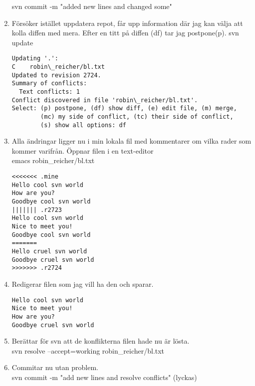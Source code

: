 \documentclass[11pt]{article}
\begin{document}
\begin{enumerate}
svn commit -m "added new lines and changed some" \\
\item Försöker istället uppdatera repot, får upp information där jag kan välja att kolla diffen med mera. Efter en titt på diffen (df) tar jag postpone(p). 
svn update
\begin{verbatim}
Updating '.':
C    robin\_reicher/bl.txt
Updated to revision 2724.
Summary of conflicts:
  Text conflicts: 1
Conflict discovered in file 'robin\_reicher/bl.txt'.
Select: (p) postpone, (df) show diff, (e) edit file, (m) merge,
        (mc) my side of conflict, (tc) their side of conflict,
        (s) show all options: df
\end{verbatim}
\item Alla ändringar ligger nu i min lokala fil med kommentarer om vilka rader som kommer varifrån. Öppnar filen i en text-editor\\
emacs robin\_reicher/bl.txt  \\
\begin{verbatim}
<<<<<<< .mine
Hello cool svn world
How are you?
Goodbye cool svn world
||||||| .r2723
Hello cool svn world
Nice to meet you!
Goodbye cool svn world
=======
Hello cruel svn world
Goodbye cruel svn world
>>>>>>> .r2724
\end{verbatim}
\item Redigerar filen som jag vill ha den och sparar.
\begin{verbatim}
Hello cool svn world
Nice to meet you!
How are you?
Goodbye cruel svn world
\end{verbatim}
\item Berättar för svn att de konflikterna filen hade nu är lösta. \\
svn resolve --accept=working robin\_reicher/bl.txt
\item Commitar nu utan problem. \\
svn commit -m "add new lines and resolve conflicts" (lyckas)
\end{enumerate}
\end{document}
